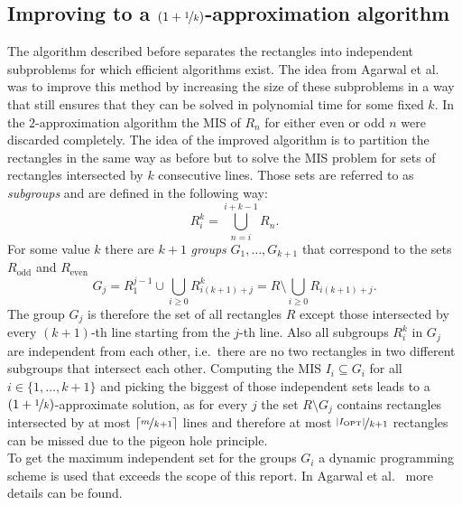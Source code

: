 \subsection{Improving to a $(1+\nicefrac{1}{k})$-approximation algorithm}
The algorithm described before separates the rectangles into independent subproblems for which efficient algorithms exist. The idea from Agarwal et al. was to improve this method by increasing the size of these subproblems in a way that still ensures that they can be solved in polynomial time for some fixed $k$. In the $2$-approximation algorithm the MIS of $R_n$ for either even or odd $n$ were discarded completely. The idea of the improved algorithm is to partition the rectangles in the same way as before but to solve the MIS problem for sets of rectangles intersected by $k$ consecutive lines. Those sets are referred to as \textit{subgroups} and are defined in the following way:
\begin{equation*}
R_i^k = \bigcup_{n = i}^{i+k-1}R_n.
\end{equation*}
For some value $k$ there are $k+1$ \textit{groups} $G_1, \ldots, G_{k+1}$ that correspond to the sets $R_\text{odd}$ and $R_\text{even}$
\begin{equation*}
G_j = R_1^{j-1} \cup \bigcup_{i\geq 0}R_{i(k+1)+j}^k  = R \setminus \bigcup_{i\geq 0} R_{i(k+1)+j}.
\end{equation*}
The group $G_j$ is therefore the set of all rectangles $R$ except those intersected by every $(k+1)$-th line starting from the $j$-th line. Also all subgroups $R_i^k$ in $G_j$ are independent from each other, i.e.\ there are no two rectangles in two different subgroups that intersect each other.
Computing the MIS $I_i \subseteq G_i$ for all $i\in \{1,\ldots,k+1\}$ and picking the biggest of those independent sets leads to a $(1+\nicefrac{1}{k})$-approximate solution, %
as for every $j$ the set $R\setminus G_j$ contains rectangles intersected by at most $\lceil \nicefrac{m}{k+1}\rceil$ lines %
 and therefore at most $\nicefrac{|I_\text{OPT}|}{k+1}$ rectangles can be missed due to the pigeon hole principle. \\
 
 To get the maximum independent set for the groups $G_i$ a dynamic programming scheme is used that exceeds the scope of this report. In Agarwal et al.~\cite[Section 4.2]{agarwallabel} more details can be found.

